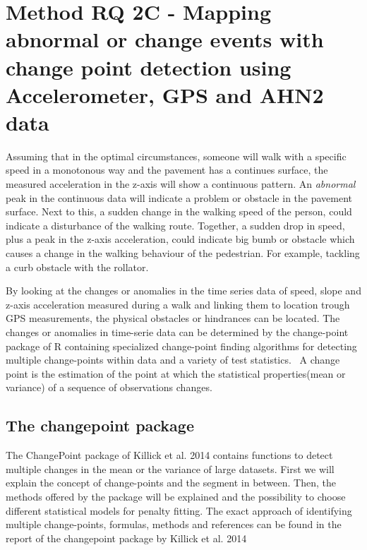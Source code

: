 \section{Method RQ 2C - Mapping abnormal or change events with change point detection using Accelerometer, GPS and AHN2 data}

Assuming that in the optimal circumstances, someone will walk with a specific speed in a monotonous way and the pavement has a continues surface, the measured acceleration in the z-axis will show a continuous pattern. An \emph{abnormal} peak in the continuous data will indicate a problem or obstacle in the pavement surface. Next to this, a sudden change in the walking speed of the person, could indicate a disturbance of the walking route. Together, a sudden drop in speed, plus a peak in the z-axis acceleration, could indicate big bumb or obstacle which causes a change in the walking behaviour of the pedestrian. For example, tackling a curb obstacle with the rollator. 

By looking at the changes or anomalies in the time series data of speed, slope and z-axis acceleration measured during a walk and linking them to location trough GPS measurements, the physical obstacles or hindrances can be located. The changes or anomalies in time-serie data can be determined by the change-point package of R containing specialized change-point finding algorithms for detecting multiple change-points within data and a variety of test statistics.~\cite{changepoint2015,  killick2014} A change point is the estimation of the point at which the statistical properties(mean or variance) of a sequence of observations changes.

\subsection{The changepoint package}
The ChangePoint package of Killick et al. 2014 contains functions to detect multiple changes in the mean or the variance of large datasets. First we will explain the concept of change-points and the segment in between. Then, the methods offered by the package will be explained and the possibility to choose different statistical models for penalty fitting. The exact approach of identifying multiple change-points, formulas, methods and references can be found in the report of the changepoint package by Killick et al. 2014~\cite{killick2014}

